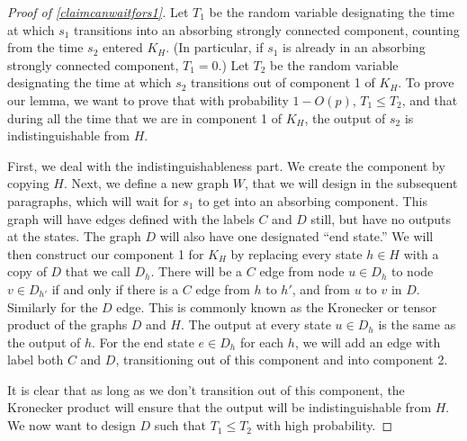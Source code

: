\documentclass[11pt]{amsart}
\theoremstyle{definition}
\theoremstyle{remark}
\begin{document}
      \begin{proof}[Proof of \cref{claimcanwaitfors1}]

        Let $T_1$ be the random variable designating the time at which $s_1$ transitions into an absorbing strongly connected component, counting from the time $s_2$ entered $K_H$. (In particular, if $s_1$ is already in an absorbing strongly connected component, $T_1 = 0$.)
        Let $T_2$ be the random variable designating the time at which $s_2$ transitions out of component 1 of $K_H$.
        To prove our lemma, we want to prove that with probability $1 - O(p)$, $T_1 \leq T_2$, and that during all the time that we are in component 1 of $K_H$, the output of $s_2$ is indistinguishable from $H$.

        First, we deal with the indistinguishableness part. We create the component by copying $H$. Next, we define a new graph $W$, that we will design in the subsequent paragraphs, which will wait for $s_1$ to get into an absorbing component. This graph will have edges defined with the labels $C$ and $D$ still, but have no outputs at the states. The graph $D$ will also have one designated ``end state.'' We will then construct our component 1 for $K_H$ by replacing every state $h \in H$ with a copy of $D$ that we call $D_h$. There will be a $C$ edge from node $u \in D_h$ to node $v \in D_{h'}$ if and only if there is a $C$ edge from $h$ to $h'$, and from $u$ to $v$ in $D$. Similarly for the $D$ edge. This is commonly known as the Kronecker or tensor product of the graphs $D$ and $H$. The output at every state $u \in D_h$ is the same as the output of $h$. For the end state $e \in D_h$ for each $h$, we will add an edge with label both $C$ and $D$, transitioning out of this component and into component 2.

        It is clear that as long as we don't transition out of this component, the Kronecker product will ensure that the output will be indistinguishable from $H$. We now want to design $D$ such that $T_1 \leq T_2$ with high probability.
        

\end{proof}
\end{document}
